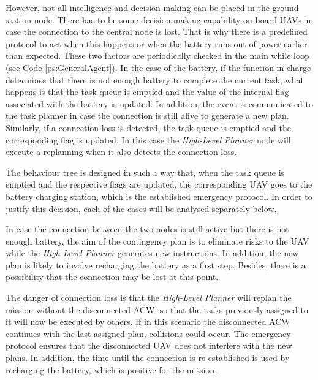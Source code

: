 \documentclass[fontsize=11pt, English=false, Español=true, Myfinal=true, twoside, numbers=noenddot]{scrbook}
\begin{document}
However, not all intelligence and decision-making can be placed in the ground station node. There has to be some decision-making capability on board \glspl{UAV} in case the connection to the central node is lost. That is why there is a predefined protocol to act when this happens or when the battery runs out of power earlier than expected. These two factors are periodically checked in the main while loop (see Code \ref{ps:GeneralAgent}). In the case of the battery, if the function in charge determines that there is not enough battery to complete the current task, what happens is that the task queue is emptied and the value of the internal flag associated with the battery is updated. In addition, the event is communicated to the task planner in case the connection is still alive to generate a new plan. Similarly, if a connection loss is detected, the task queue is emptied and the corresponding flag is updated. In this case the \emph{High-Level Planner} node will execute a replanning when it also detects the connection loss.

The behaviour tree is designed in such a way that, when the task queue is emptied and the respective flags are updated, the corresponding \gls{UAV} goes to the battery charging station, which is the established emergency protocol. In order to justify this decision, each of the cases will be analysed separately below.

In case the connection between the two nodes is still active but there is not enough battery, the aim of the contingency plan is to eliminate risks to the \gls{UAV} while the \emph{High-Level Planner} generates new instructions. In addition, the new plan is likely to involve recharging the battery as a first step. Besides, there is a possibility that the connection may be lost at this point.

The danger of connection loss is that the \emph{High-Level Planner} will replan the mission without the disconnected \gls{ACW}, so that the tasks previously assigned to it will now be executed by others. If in this scenario the disconnected \gls{ACW} continues with the last assigned plan, collisions could occur. The emergency protocol ensures that the disconnected \gls{UAV} does not interfere with the new plans. In addition, the time until the connection is re-established is used by recharging the battery, which is positive for the mission.

\end{document}
